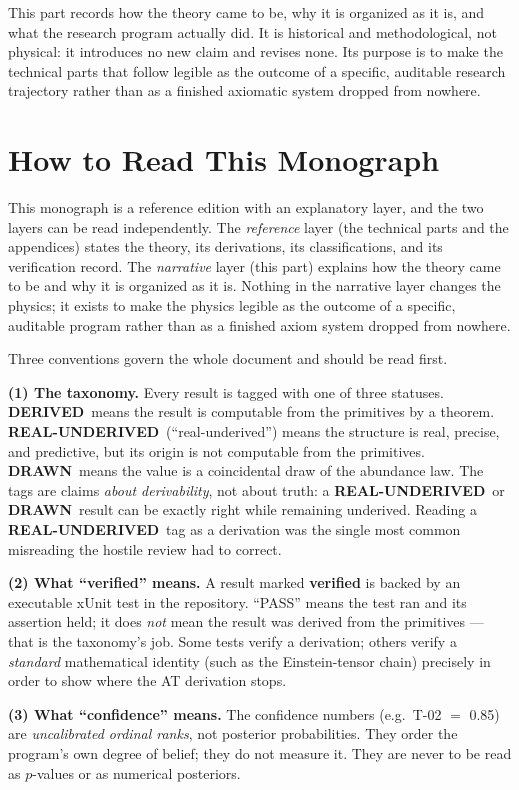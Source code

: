 \documentclass[10pt,twoside,openany]{book}
\newcommand{\derived}{\textbf{DERIVED}}
\newcommand{\realunder}{\textbf{REAL-UNDERIVED}}
\newcommand{\drawn}{\textbf{DRAWN}}
\begin{document}
This part records how the theory came to be, why it is organized as it is, and what the
research program actually did. It is historical and methodological, not physical: it
introduces no new claim and revises none. Its purpose is to make the technical parts that
follow legible as the outcome of a specific, auditable research trajectory rather than as
a finished axiomatic system dropped from nowhere.

\chapter{How to Read This Monograph}
\label{ch:reading}

This monograph is a reference edition with an explanatory layer, and the two layers can be
read independently. The \emph{reference} layer (the technical parts and the appendices)
states the theory, its derivations, its classifications, and its verification record. The
\emph{narrative} layer (this part) explains how the theory came to be and why it is
organized as it is. Nothing in the narrative layer changes the physics; it exists to make
the physics legible as the outcome of a specific, auditable program rather than as a
finished axiom system dropped from nowhere.

Three conventions govern the whole document and should be read first.

\textbf{(1) The taxonomy.} Every result is tagged with one of three statuses.
\derived\ means the result is computable from the primitives by a theorem.
\realunder\ (``real-underived'') means the structure is real, precise, and predictive, but
its origin is not computable from the primitives. \drawn\ means the value is a
coincidental draw of the abundance law. The tags are claims \emph{about derivability}, not
about truth: a \realunder\ or \drawn\ result can be exactly right while remaining
underived. Reading a \realunder\ tag as a derivation was the single most common misreading
the hostile review had to correct.

\textbf{(2) What ``verified'' means.} A result marked \textbf{verified} is backed by an
executable xUnit test in the repository. ``PASS'' means the test ran and its assertion
held; it does \emph{not} mean the result was derived from the primitives --- that is the
taxonomy's job. Some tests verify a derivation; others verify a \emph{standard}
mathematical identity (such as the Einstein-tensor chain) precisely in order to show where
the AT derivation stops.

\textbf{(3) What ``confidence'' means.} The confidence numbers (e.g.\ T-02 $=$ 0.85) are
\emph{uncalibrated ordinal ranks}, not posterior probabilities. They order the program's
own degree of belief; they do not measure it. They are never to be read as $p$-values or
as numerical posteriors.
\end{document}
